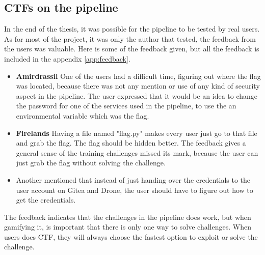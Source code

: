 \subsection{\ac{CTF}s on the pipeline}
In the end of the thesis, it was possible for the pipeline to be tested by real users. 
As for most of the project, it was only the author that tested, the feedback from the users was valuable.
Here is some of the feedback given, but all the feedback is included in the appendix \ref{app:feedback}.
\begin{itemize}
    \item \textbf{Amirdrassil} 
    One of the users had a difficult time, figuring out where the flag was located, because there 
    was not any mention or use of any kind of security aspect in the pipeline. The user 
    expressed that it would be an idea to change the password for one of the services used in the pipeline, to 
    use the an environmental variable which was the flag.
    \item \textbf{Firelands}
    Having a file named "flag.py" makes every user just go to that file and grab the flag. 
    The flag should be hidden better. The feedback gives a general sense of the training challenges missed its mark, 
    because the user can just grab the flag without solving the challenge.
    \item Another mentioned that instead of just handing over the credentials to the user account 
    on Gitea and Drone, the user should have to figure out how to get the credentials.
\end{itemize}

The feedback indicates that the challenges in the pipeline does work, but when gamifying
it, is important that there is only one way to solve challenges. When users does \ac{CTF}, they 
will always choose the fastest option to exploit or solve the challenge.